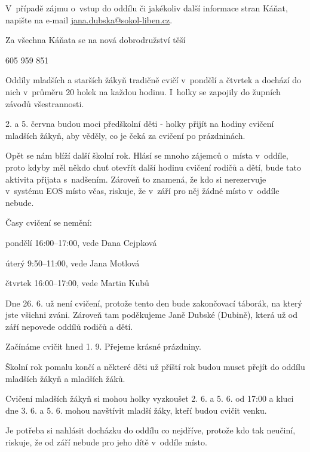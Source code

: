\documentclass[11pt]{article}
\begin{document}
V~případě zájmu o~vstup do oddílu či jakékoliv další informace stran
Káňat, napište na e-mail
\href{mailto:jana.dubska@sokol-liben.cz}{jana.dubska@sokol-liben.cz}.

Za všechna Káňata se na nová dobrodružství těší

\signature{Jana Dubská (Dubina)}{605 959 851}

\vspace*{24pt}

Oddíly mladších a starších žákyň tradičně cvičí v~pondělí a čtvrtek a
dochází do nich v~průměru 20 holek na každou hodinu. I~holky se zapojily
do župních závodů všestrannosti.

2. a 5. června budou moci předškolní děti - holky přijít na
hodiny cvičení mladších žákyň, aby věděly, co je čeká za cvičení po
prázdninách.

\signature{Tomáš Dragoun}{}

\clearpage

Opět se nám blíží další školní rok. Hlásí se mnoho zájemců o~místa
v~oddíle, proto kdyby měl někdo chuť otevřít další hodinu cvičení rodičů
a dětí, bude tato aktivita přijata s~nadšením. Zároveň to znamená, že
kdo si nerezervuje v~systému EOS místo včas, riskuje, že v~září pro něj
žádné místo v~oddíle nebude.

Časy cvičení se nemění:

pondělí 16:00--17:00, vede Dana Cejpková

úterý 9:50--11:00, vede Jana Motlová

čtvrtek 16:00--17:00, vede Martin Kubů

Dne 26. 6. už není cvičení, protože tento den bude
zakončovací táborák, na který jste všichni zváni. Zároveň tam
poděkujeme Janě Dubské (Dubině), která už od září nepovede oddílů rodičů
a dětí.

Začínáme cvičit hned 1. 9. Přejeme krásné prázdniny.

\signature{Jana, Dana, Jana a nově Martin}{}

Školní rok pomalu končí a některé děti už příští rok budou muset přejít
do oddílu mladších žákyň a mladších žáků.

Cvičení mladších žákyň si mohou holky vyzkoušet 2. 6. a 5. 6. od 17:00 a
kluci dne 3. 6. a 5. 6. mohou navštívit mladší žáky, kteří budou cvičit
venku.

Je potřeba si nahlásit docházku do oddílu co nejdříve, protože kdo tak
neučiní, riskuje, že od září nebude pro jeho dítě v~oddíle místo.
\end{document}

